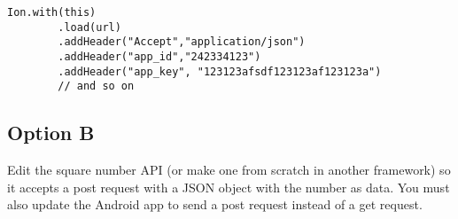 \begin{lstlisting}[style=A_Java]
Ion.with(this)
        .load(url)
        .addHeader("Accept","application/json")
        .addHeader("app_id","242334123")
        .addHeader("app_key", "123123afsdf123123af123123a")
        // and so on
\end{lstlisting}

\subsection{Option B}
Edit the square number API (or make one from scratch in another framework) so it accepts a post request with a JSON object with the number as data. You must also update the Android app to send a post request instead of a get request.

